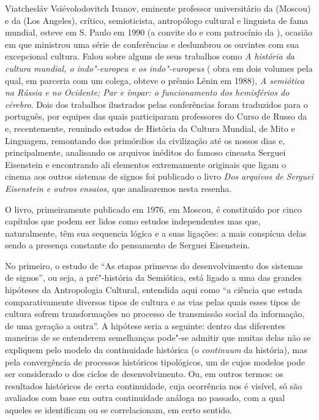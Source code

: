 Viatchesláv Vsiévolodovitch Ivanov, eminente professor universitário da
 (Moscou) e da  (Los Angeles), crítico, semioticista,
antropólogo cultural e linguista de fama mundial, esteve em S. Paulo em
1990 (a convite do  e com patrocínio da ), ocasião em que
ministrou uma série de conferências e deslumbrou os ouvintes com sua
excepcional cultura. Falou sobre alguns de seus trabalhos como \emph{A
história da cultura mundial, o indo"-europeu e os indo"-europeus} (
obra em dois volumes pela qual, em parceria com um colega, obteve o
prêmio Lênin em 1988), \emph{A semiótica na Rússia e no Ocidente; Par e
ímpar: o funcionamento dos hemisférios do cérebro}. Dois dos trabalhos
ilustrados pelas conferências foram traduzidos para o português, por
equipes das quais participaram professores do Curso de Russo da  e, recentemente, reunindo estudos de
História da Cultura Mundial, de Mito e Linguagem, remontando dos
primórdios da civilização até os nossos dias e, principalmente,
analisando os arquivos inéditos do famoso cineasta Serguei Eisenstein e
encontrando ali elementos extremamente originais que ligam o cinema aos
outros sistemas de signos foi publicado o livro \emph{Dos arquivos de
Serguei Eisenstein e outros ensaios,} que analisaremos nesta resenha.

O livro, primeiramente publicado em 1976, em Moscou, é constituído por
cinco capítulos que podem ser lidos como estudos independentes mas que,
naturalmente, têm sua sequencia lógica e a suas ligações: a mais
conspícua delas sendo a presença constante do pensamento de Serguei
Eisenstein.

No primeiro, o estudo de ``As etapas primevas do desenvolvimento
dos sistemas de signos'', ou seja, a pré"-história da Semiótica, está
ligado a uma das grandes hipóteses da Antropologia Cultural, entendida
aqui como ``a ciência que estuda comparativamente diversos tipos de
cultura e as vias pelas quais esses tipos de cultura sofrem
transformações no processo de transmissão social da informação, de uma
geração a outra''. A hipótese seria a seguinte: dentro
das diferentes maneiras de se entenderem semelhanças pode"-se admitir que
muitas delas não se expliquem pelo modelo da continuidade histórica (o
\emph{continuum} da história), mas pela convergência de processos
históricos tipológicos, um de cujos modelos pode ser considerado o dos
ciclos de desenvolvimento. Ou, em outros termos: os resultados
históricos de certa continuidade, cuja ocorrência nos é visível, só são
avaliados com base em outra continuidade análoga no passado, com a qual
aqueles se identificam ou se correlacionam, em certo sentido.

